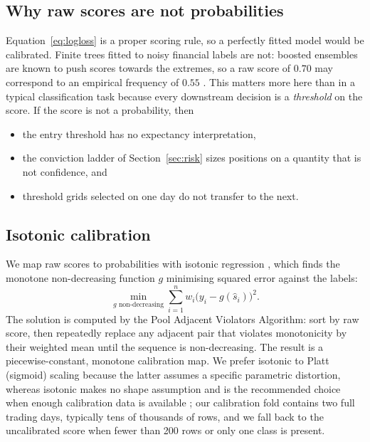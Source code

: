 \documentclass[11pt,a4paper]{article}
\begin{document}
\subsection{Why raw scores are not probabilities}

Equation~\eqref{eq:logloss} is a proper scoring rule, so a perfectly fitted model would
be calibrated. Finite trees fitted to noisy financial labels are not: boosted ensembles
are known to push scores towards the extremes, so a raw score of $0.70$ may correspond to
an empirical frequency of $0.55$ \cite{sklearncalib}. This matters more here than in a
typical classification task because every downstream decision is a \emph{threshold} on
the score. If the score is not a probability, then

\begin{itemize}
  \item the entry threshold has no expectancy interpretation,
  \item the conviction ladder of Section~\ref{sec:risk} sizes positions on a quantity
        that is not confidence, and
  \item threshold grids selected on one day do not transfer to the next.
\end{itemize}

\subsection{Isotonic calibration}

We map raw scores to probabilities with isotonic regression \cite{zadrozny}, which finds
the monotone non-decreasing function $g$ minimising squared error against the labels:
\begin{equation}
\min_{g \text{ non-decreasing}} \sum_{i=1}^{n} w_i\big(y_i - g(\hat{s}_i)\big)^2 .
\label{eq:isotonic}
\end{equation}
The solution is computed by the Pool Adjacent Violators Algorithm: sort by raw score,
then repeatedly replace any adjacent pair that violates monotonicity by their weighted
mean until the sequence is non-decreasing. The result is a piecewise-constant, monotone
calibration map. We prefer isotonic to Platt (sigmoid) scaling because the latter assumes
a specific parametric distortion, whereas isotonic makes no shape assumption and is the
recommended choice when enough calibration data is available \cite{sklearncalib}; our
calibration fold contains two full trading days, typically tens of thousands of rows, and
we fall back to the uncalibrated score when fewer than 200 rows or only one class is
present.
\end{document}
